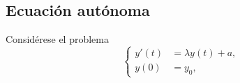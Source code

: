 \documentclass[11pt]{report}
\theoremstyle{mytheorem}
\theoremstyle{mydefinition}
\theoremstyle{myexample}
\begin{document}
{\subsection{Ecuación autónoma}

Considérese el problema
\[\left\{\begin{alignedat}{1}
    y'(t)&=\lambda y(t)+a, \\
    y(0)&=y_0,
\end{alignedat}\right.\]
}
\end{document}
